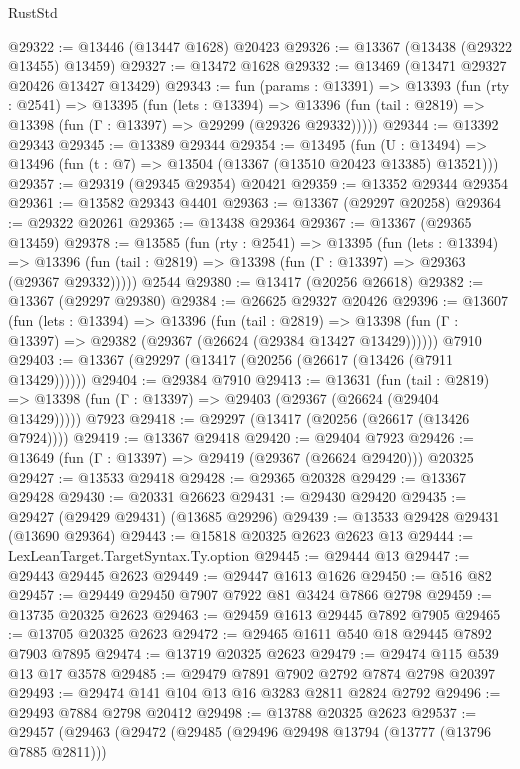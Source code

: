 \begin{lexlean}{RustStd}
\begin{coremodule}
@29322 := @13446 (@13447 @1628) @20423
@29326 := @13367 (@13438 (@29322 @13455) @13459)
@29327 := @13472 @1628
@29332 := @13469 (@13471 @29327 @20426 @13427 @13429)
@29343 := fun (params : @13391) =>
  @13393
    (fun (rty : @2541) =>
    @13395
      (fun (lets : @13394) =>
      @13396 (fun (tail : @2819) => @13398 (fun (Γ : @13397) => @29299 (@29326 @29332)))))
@29344 := @13392 @29343
@29345 := @13389 @29344
@29354 := @13495
    (fun (U : @13494) => @13496 (fun (t : @7) => @13504 (@13367 (@13510 @20423 @13385) @13521)))
@29357 := @29319 (@29345 @29354) @20421
@29359 := @13352 @29344 @29354
@29361 := @13582 @29343 @4401
@29363 := @13367 (@29297 @20258)
@29364 := @29322 @20261
@29365 := @13438 @29364
@29367 := @13367 (@29365 @13459)
@29378 := @13585
    (fun (rty : @2541) =>
    @13395
      (fun (lets : @13394) =>
      @13396 (fun (tail : @2819) => @13398 (fun (Γ : @13397) => @29363 (@29367 @29332)))))
    @2544
@29380 := @13417 (@20256 @26618)
@29382 := @13367 (@29297 @29380)
@29384 := @26625 @29327 @20426
@29396 := @13607
    (fun (lets : @13394) =>
    @13396
      (fun (tail : @2819) =>
      @13398 (fun (Γ : @13397) => @29382 (@29367 (@26624 (@29384 @13427 @13429))))))
    @7910
@29403 := @13367 (@29297 (@13417 (@20256 (@26617 (@13426 (@7911 @13429))))))
@29404 := @29384 @7910
@29413 := @13631
    (fun (tail : @2819) => @13398 (fun (Γ : @13397) => @29403 (@29367 (@26624 (@29404 @13429)))))
    @7923
@29418 := @29297 (@13417 (@20256 (@26617 (@13426 @7924))))
@29419 := @13367 @29418
@29420 := @29404 @7923
@29426 := @13649 (fun (Γ : @13397) => @29419 (@29367 (@26624 @29420))) @20325
@29427 := @13533 @29418
@29428 := @29365 @20328
@29429 := @13367 @29428
@29430 := @20331 @26623
@29431 := @29430 @29420
@29435 := @29427 (@29429 @29431) (@13685 @29296)
@29439 := @13533 @29428 @29431 (@13690 @29364)
@29443 := @15818 @20325 @2623 @2623 @13
@29444 := LexLeanTarget.TargetSyntax.Ty.option
@29445 := @29444 @13
@29447 := @29443 @29445 @2623
@29449 := @29447 @1613 @1626
@29450 := @516 @82
@29457 := @29449 @29450 @7907 @7922 @81 @3424 @7866 @2798
@29459 := @13735 @20325 @2623
@29463 := @29459 @1613 @29445 @7892 @7905
@29465 := @13705 @20325 @2623
@29472 := @29465 @1611 @540 @18 @29445 @7892 @7903 @7895
@29474 := @13719 @20325 @2623
@29479 := @29474 @115 @539 @13 @17 @3578
@29485 := @29479 @7891 @7902 @2792 @7874 @2798 @20397
@29493 := @29474 @141 @104 @13 @16 @3283 @2811 @2824 @2792
@29496 := @29493 @7884 @2798 @20412
@29498 := @13788 @20325 @2623
@29537 := @29457
    (@29463
      (@29472
        (@29485
          (@29496 @29498 @13794 (@13777 (@13796 @7885 @2811)))

\end{coremodule}
\end{lexlean}

